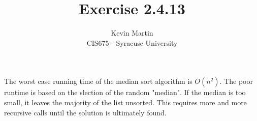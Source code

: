 \documentclass{article}
\author{Kevin Martin\\ CIS675 - Syracuse University}
\title{Exercise 2.4.13}
\begin{document}
\maketitle
The worst case running time of the median sort algorithm is \(O(n^2)\). The poor runtime is based on the slection of the random "median". If the median is too small, it leaves the
majority of the list unsorted. This requires more and more recursive calls until the solution is ultimately found.
\end{document}
